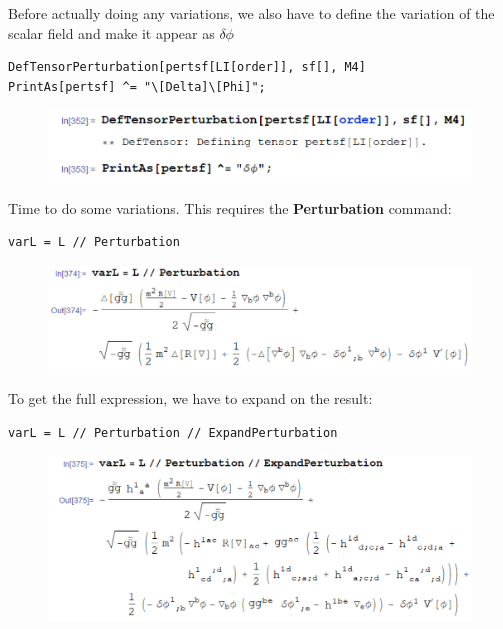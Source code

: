\documentclass{book}
\theoremstyle{definition}
\begin{document}
Before actually doing any variations, we also have to define the variation of the scalar field and make it appear as $\delta \phi$
\begin{lstlisting}
DefTensorPerturbation[pertsf[LI[order]], sf[], M4]
PrintAs[pertsf] ^= "\[Delta]\[Phi]";
\end{lstlisting}
\begin{figure}[!htb]
	\includegraphics[scale=0.2]{var-scalar}
\end{figure}

Time to do some variations. This requires the \textbf{Perturbation} command:
\begin{lstlisting}
varL = L // Perturbation
\end{lstlisting}


\begin{figure}[!htb]
	\includegraphics[scale=0.19]{varL1}
\end{figure}


To get the full expression, we have to expand on the result:
\begin{lstlisting}
varL = L // Perturbation // ExpandPerturbation
\end{lstlisting}
\begin{figure}[!htb]
	\includegraphics[scale=0.19]{varL2}
\end{figure}
\end{document}
